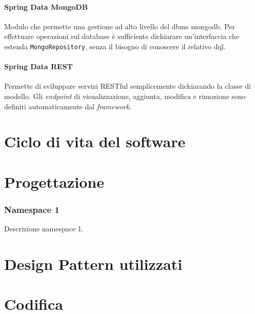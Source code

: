 \paragraph*{Spring Data MongoDB} Modulo che permette una gestione ad alto livello del \acrshort{dbms} \gls{mongodb}.
Per effettuare operazioni sul database è sufficiente dichiarare un'interfaccia che estenda \texttt{MongoRepository}, senza il bisogno di conoscere il relativo \gls{dql}.

\paragraph*{Spring Data REST} Permette di sviluppare servizi RESTful semplicemente dichiarando la classe di modello.
Gli \textit{endpoint} di visualizzazione, aggiunta, modifica e rimozione sono definiti automaticamente dal \textit{framework}.

\section{Ciclo di vita del software}
\label{sec:ciclo-vita-software}

\section{Progettazione}
\label{sec:progettazione}

\subsubsection{Namespace 1} %
Descrizione namespace 1.

\begin{namespacedesc}
\end{namespacedesc}


\section{Design Pattern utilizzati}

\section{Codifica}
